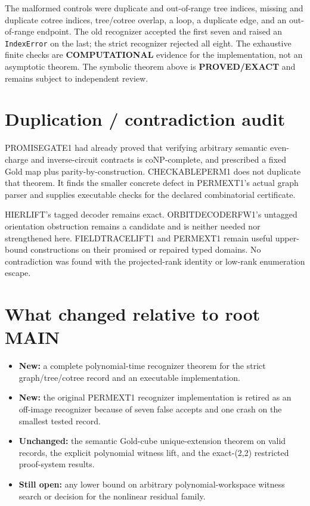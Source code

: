 \documentclass[11pt]{article}
\newcommand{\EXACT}{\textbf{PROVED/EXACT}}
\newcommand{\COMP}{\textbf{COMPUTATIONAL}}
\begin{document}
The malformed controls were duplicate and out-of-range tree indices, missing
and duplicate cotree indices, tree/cotree overlap, a loop, a duplicate edge,
and an out-of-range endpoint.  The old recognizer accepted the first seven and
raised an \texttt{IndexError} on the last; the strict recognizer rejected all
eight.  The exhaustive finite checks are \COMP{} evidence for the implementation,
not an asymptotic theorem.  The symbolic theorem above is \EXACT{} and remains
subject to independent review.

\section{Duplication / contradiction audit}
PROMISEGATE1 had already proved that verifying arbitrary semantic
even-charge and inverse-circuit contracts is coNP-complete, and prescribed a
fixed Gold map plus parity-by-construction.  CHECKABLEPERM1 does not duplicate
that theorem.  It finds the smaller concrete defect in PERMEXT1's actual graph
parser and supplies executable checks for the declared combinatorial
certificate.

HIERLIFT's tagged decoder remains exact.  ORBITDECODERFW1's untagged
orientation obstruction remains a candidate and is neither needed nor
strengthened here.  FIELDTRACELIFT1 and PERMEXT1 remain useful upper-bound
constructions on their promised or repaired typed domains.  No contradiction
was found with the projected-rank identity or low-rank enumeration escape.

\section{What changed relative to root MAIN}
\begin{itemize}
\item \textbf{New:} a complete polynomial-time recognizer theorem for the
strict graph/tree/cotree record and an executable implementation.
\item \textbf{New:} the original PERMEXT1 recognizer implementation is retired
as an off-image recognizer because of seven false accepts and one crash on the
smallest tested record.
\item \textbf{Unchanged:} the semantic Gold-cube unique-extension theorem on
valid records, the explicit polynomial witness lift, and the exact-(2,2)
restricted proof-system results.
\item \textbf{Still open:} any lower bound on arbitrary polynomial-workspace
witness search or decision for the nonlinear residual family.
\end{itemize}
\end{document}
